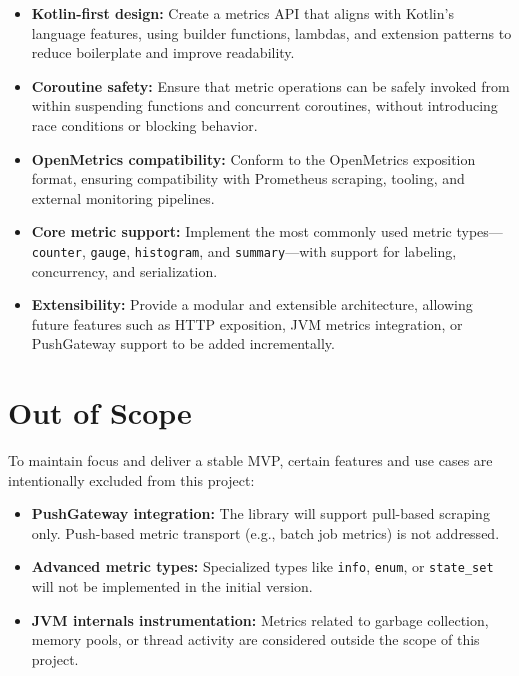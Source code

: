 \begin{itemize}
  \item \textbf{Kotlin-first design:} Create a metrics API that aligns with Kotlin’s language features, using builder functions, lambdas, and extension patterns to reduce boilerplate and improve readability.
  \item \textbf{Coroutine safety:} Ensure that metric operations can be safely invoked from within suspending functions and concurrent coroutines, without introducing race conditions or blocking behavior.
  \item \textbf{OpenMetrics compatibility:} Conform to the OpenMetrics exposition format, ensuring compatibility with Prometheus scraping, tooling, and external monitoring pipelines.
  \item \textbf{Core metric support:} Implement the most commonly used metric types—\texttt{counter}, \texttt{gauge}, \texttt{histogram}, and \texttt{summary}—with support for labeling, concurrency, and serialization.
  \item \textbf{Extensibility:} Provide a modular and extensible architecture, allowing future features such as HTTP exposition, JVM metrics integration, or PushGateway support to be added incrementally.
\end{itemize}

\section{Out of Scope}

To maintain focus and deliver a stable MVP, certain features and use cases are intentionally excluded from this project:

\begin{itemize}
  \item \textbf{PushGateway integration:} The library will support pull-based scraping only. Push-based metric transport (e.g., batch job metrics) is not addressed.
  \item \textbf{Advanced metric types:} Specialized types like \texttt{info}, \texttt{enum}, or \texttt{state\_set} will not be implemented in the initial version.
  \item \textbf{JVM internals instrumentation:} Metrics related to garbage collection, memory pools, or thread activity are considered outside the scope of this project.
\end{itemize}
